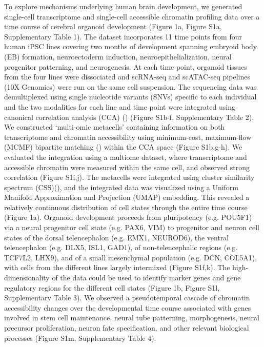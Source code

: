 To explore mechanisms underlying human brain development, we generated single-cell transcriptome and single-cell accessible chromatin profiling data over a time course of cerebral organoid development (Figure 1a, Figure S1a, Supplementary Table 1). The dataset incorporates 11 time points from four human iPSC lines covering two months of development spanning embryoid body (EB) formation, neuroectoderm induction, neuroepithelialization, neural progenitor patterning, and neurogenesis. At each time point, organoid tissues from the four lines were dissociated and scRNA-seq and scATAC-seq pipelines (10X Genomics) were run on the same cell suspension. The sequencing data was demultiplexed using single nucleotide variants (SNVs) specific to each individual and the two modalities for each line and time point were integrated using canonical correlation analysis (CCA) (\cite{stuart_comprehensive_2019}) (Figure S1b-f, Supplementary Table 2). We constructed ‘multi-omic metacells’ containing information on both transcriptome and chromatin accessibility using minimum-cost, maximum-flow (MCMF) bipartite matching (\cite{stark_scim_2020}) within the CCA space (Figure S1b,g-h). We evaluated the integration using a multiome dataset, where transcriptome and accessible chromatin were measured within the same cell, and observed strong correlation (Figure S1i,j). The metacells were integrated using cluster similarity spectrum (CSS)(\cite{he_css_2020}), and the integrated data was visualized using a Uniform Manifold Approximation and Projection (UMAP) embedding. This revealed a relatively continuous distribution of cell states through the entire time course (Figure 1a). Organoid development proceeds from pluripotency (e.g. POU5F1) via a neural progenitor cell state (e.g. PAX6, VIM) to progenitor and neuron cell states of the dorsal telencephalon (e.g. EMX1, NEUROD6), the ventral telencephalon (e.g. DLX5, ISL1, GAD1), of non-telencephalic regions (e.g. TCF7L2, LHX9), and of a small mesenchymal population (e.g. DCN, COL5A1), with cells from the different lines largely intermixed (Figure S1f,k). The high-dimensionality of the data could be used to identify marker genes and gene regulatory regions for the different cell states (Figure 1b, Figure S1l, Supplementary Table 3). We observed a pseudotemporal cascade of chromatin accessibility changes over the developmental time course associated with genes involved in stem cell maintenance, neural tube patterning, morphogenesis, neural precursor proliferation, neuron fate specification, and other relevant biological processes (Figure S1m, Supplementary Table 4).

